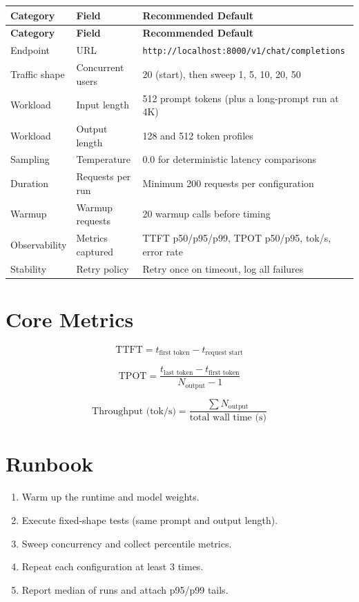 \documentclass[10pt, oneside, openany]{book}
\newcommand{\code}[1]{\texttt{#1}}
\begin{document}
\begin{longtable}{@{}p{3.8cm}p{3.5cm}p{5.8cm}@{}}
  \toprule
  \textbf{Category} & \textbf{Field} & \textbf{Recommended Default} \\
  \midrule
  \endfirsthead
  \toprule
  \textbf{Category} & \textbf{Field} & \textbf{Recommended Default} \\
  \midrule
  \endhead
  Endpoint & URL & \code{http://localhost:8000/v1/chat/completions} \\
  Traffic shape & Concurrent users & 20 (start), then sweep 1, 5, 10, 20, 50 \\
  Workload & Input length & 512 prompt tokens (plus a long-prompt run at 4K) \\
  Workload & Output length & 128 and 512 token profiles \\
  Sampling & Temperature & 0.0 for deterministic latency comparisons \\
  Duration & Requests per run & Minimum 200 requests per configuration \\
  Warmup & Warmup requests & 20 warmup calls before timing \\
  Observability & Metrics captured & TTFT p50/p95/p99, TPOT p50/p95, tok/s, error rate \\
  Stability & Retry policy & Retry once on timeout, log all failures \\
  \bottomrule
\end{longtable}

\section*{Core Metrics}

\[
\text{TTFT} = t_{\text{first token}} - t_{\text{request start}}
\]

\[
\text{TPOT} = \frac{t_{\text{last token}} - t_{\text{first token}}}{N_{\text{output}} - 1}
\]

\[
\text{Throughput (tok/s)} = \frac{\sum N_{\text{output}}}{\text{total wall time (s)}}
\]

\section*{Runbook}
\begin{enumerate}
  \item Warm up the runtime and model weights.
  \item Execute fixed-shape tests (same prompt and output length).
  \item Sweep concurrency and collect percentile metrics.
  \item Repeat each configuration at least 3 times.
  \item Report median of runs and attach p95/p99 tails.
\end{enumerate}
\end{document}
